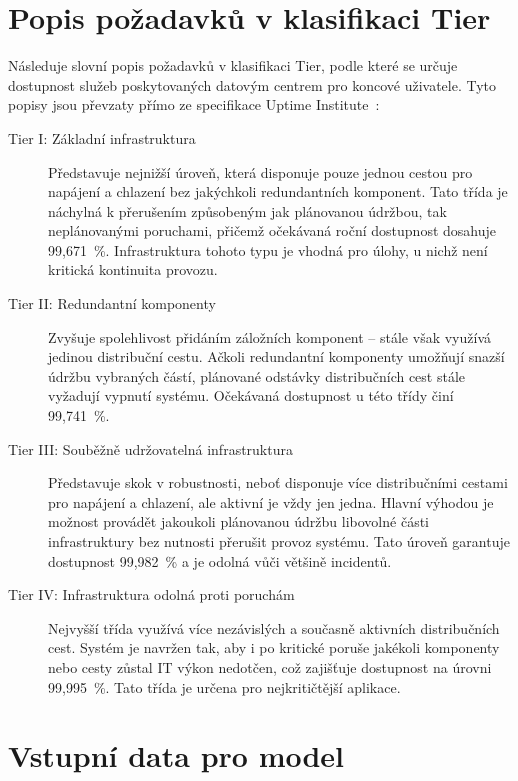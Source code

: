 \chapter{Popis požadavků v klasifikaci Tier}
\label{appendix:tiery}

Následuje slovní popis požadavků v klasifikaci Tier, podle které se určuje dostupnost služeb poskytovaných datovým centrem pro koncové uživatele. Tyto popisy jsou převzaty přímo ze specifikace Uptime Institute~\cite{turner_iv_tier_2008}:

\begin{description}
    \item[Tier I: Základní infrastruktura] Představuje nejnižší úroveň, která disponuje pouze jednou cestou pro napájení a chlazení bez jakýchkoli redundantních komponent. Tato třída je náchylná k přerušením způsobeným jak plánovanou údržbou, tak neplánovanými poruchami, přičemž očekávaná roční dostupnost dosahuje 99,671~\%. Infrastruktura tohoto typu je vhodná pro úlohy, u nichž není kritická kontinuita provozu.
    
    \item[Tier II: Redundantní komponenty] Zvyšuje spolehlivost přidáním záložních komponent -- stále však využívá jedinou distribuční cestu. Ačkoli redundantní komponenty umožňují snazší údržbu vybraných částí, plánované odstávky distribučních cest stále vyžadují vypnutí systému. Očekávaná dostupnost u této třídy činí 99,741~\%.
    
    \item[Tier III: Souběžně udržovatelná infrastruktura] Představuje skok v robustnosti, neboť disponuje více distribučními cestami pro napájení a chlazení, ale aktivní je vždy jen jedna. Hlavní výhodou je možnost provádět jakoukoli plánovanou údržbu libovolné části infrastruktury bez nutnosti přerušit provoz systému. Tato úroveň garantuje dostupnost 99,982~\% a je odolná vůči většině incidentů.

    \item[Tier IV: Infrastruktura odolná proti poruchám] Nejvyšší třída využívá více nezávislých a současně aktivních distribučních cest. Systém je navržen tak, aby i po kritické poruše jakékoli komponenty nebo cesty zůstal IT výkon nedotčen, což zajišťuje dostupnost na úrovni 99,995~\%. Tato třída je určena pro nejkritičtější aplikace.
\end{description}

\chapter{Vstupní data pro model}
\label{appendix:parametry}

